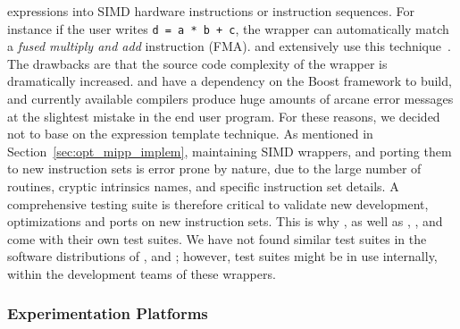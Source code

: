 expressions into SIMD hardware instructions or instruction sequences. For
instance if the user writes \verb|d = a * b + c|, the wrapper can automatically
match a \emph{fused multiply and add} instruction (FMA). \BoostSIMD and \bSIMD
extensively use this technique~\cite{Esterie2012,Esterie2012a}. The drawbacks
are that the source code complexity of the wrapper is dramatically increased.
\BoostSIMD and \bSIMD have a dependency on the Boost framework to build, and
currently available \Cxx compilers produce huge amounts of arcane error messages
at the slightest mistake in the end user program. For these reasons, we decided
not to base \MIPP on the expression template technique. As mentioned in
Section~\ref{sec:opt_mipp_implem}, maintaining SIMD wrappers, and porting them
to new instruction sets is error prone by nature, due to the large number of
routines, cryptic intrinsics names, and specific instruction set details. A
comprehensive testing suite is therefore critical to validate new development,
optimizations and ports on new instruction sets. This is why \MIPP, as well as
\Vc, \BoostSIMD, \simdpp and \bSIMD come with their own test suites. We have not
found similar test suites in the software distributions of \VCL, \xsimd and
\TSIMD; however, test suites might be in use internally, within the development
teams of these wrappers.

\subsubsection{Experimentation Platforms}
\label{sec:opt_mipp_protocol}

